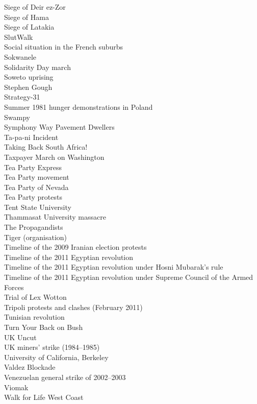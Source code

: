 Siege of Deir ez-Zor\\
Siege of Hama\\
Siege of Latakia\\
SlutWalk\\
Social situation in the French suburbs\\
Sokwanele\\
Solidarity Day march\\
Soweto uprising\\
Stephen Gough\\
Strategy-31\\
Summer 1981 hunger demonstrations in Poland\\
Swampy\\
Symphony Way Pavement Dwellers\\
Ta-pa-ni Incident\\
Taking Back South Africa!\\
Taxpayer March on Washington\\
Tea Party Express\\
Tea Party movement\\
Tea Party of Nevada\\
Tea Party protests\\
Tent State University\\
Thammasat University massacre\\
The Propagandists\\
Tiger (organisation)\\
Timeline of the 2009 Iranian election protests\\
Timeline of the 2011 Egyptian revolution\\
Timeline of the 2011 Egyptian revolution under Hosni Mubarak's rule\\
Timeline of the 2011 Egyptian revolution under Supreme Council of the Armed Forces\\
Trial of Lex Wotton\\
Tripoli protests and clashes (February 2011)\\
Tunisian revolution\\
Turn Your Back on Bush\\
UK Uncut\\
UK miners' strike (1984–1985)\\
University of California, Berkeley\\
Valdez Blockade\\
Venezuelan general strike of 2002–2003\\
Viomak\\
Walk for Life West Coast\\

